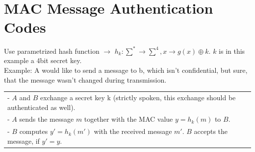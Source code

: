 \section{MAC Message Authentication Codes}
Use parametrized hash function $\to$ $h_k: \sum^* \to \sum^4, x \to g(x) \oplus k$. $k$ is in this example a 4bit secret key.\\
Example: A would like to send a message to b, which isn't confidential, but sure, that the message wasn't changed during transmission.\\
\begin{tabular}{l}
	- $A$ and $B$ exchange a secret key k (strictly spoken, this exchange should be authenticated as well).\\
	- $A$ sends the message $m$ together with the MAC value $y=h_k(m)$ to $B$.\\
	- $B$ computes $y'=h_k(m')$ with the received message $m'$. $B$ accepts the message, if $y'=y$.
\end{tabular}
